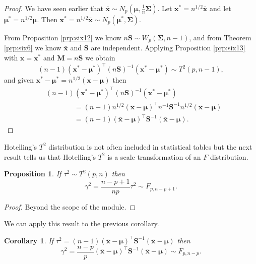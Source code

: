 \documentclass[]{book}
\newtheorem{corollary}{Corollary}[chapter]
\newtheorem{proposition}{Proposition}[chapter]
\theoremstyle{definition}
\theoremstyle{definition}
\theoremstyle{definition}
\theoremstyle{remark}
\begin{document}
\begin{proof}
{}We have seen earlier that \(\bar{\boldsymbol x} \sim N_p(\boldsymbol \mu,\frac{1}{n}\boldsymbol \Sigma)\). Let \(\boldsymbol x^\ast = n^{1/2} \bar{\boldsymbol x}\) and let \(\boldsymbol \mu^\ast = n^{1/2} \boldsymbol \mu\). Then \(\boldsymbol x^\ast=n^{1/2} \bar{\boldsymbol x} \sim N_p(\boldsymbol \mu^\ast, \boldsymbol \Sigma)\).

From Proposition \ref{prp:six12} we know \(n\boldsymbol S\sim W_p(\boldsymbol \Sigma,n-1)\), and from Theorem \ref{prp:six6} we know \(\bar{\boldsymbol x}\) and \(\boldsymbol S\) are independent. Applying Proposition \ref{prp:six13} with \(\boldsymbol x= \boldsymbol x^\ast\) and \(\boldsymbol M= n\boldsymbol S\) we obtain
\[ (n-1)(\boldsymbol x^\ast - \boldsymbol \mu^\ast)^\top (n\boldsymbol S)^{-1} (\boldsymbol x^\ast - \boldsymbol \mu^\ast) \sim T^2(p,n-1),\]
and given \(\boldsymbol x^\ast - \boldsymbol \mu^\ast = n^{1/2} (\boldsymbol x-\boldsymbol \mu)\) then
\begin{align*}
&(n-1)(\boldsymbol x^\ast - \boldsymbol \mu^\ast)^\top (n\boldsymbol S)^{-1} (\boldsymbol x^\ast - \boldsymbol \mu^\ast)\\
& \qquad \qquad = (n-1)n^{1/2}(\bar{\boldsymbol x}-\boldsymbol \mu)^\top n^{-1} \boldsymbol S^{-1} n^{1/2}(\bar{\boldsymbol x}-\boldsymbol \mu) \\
&\qquad \qquad = (n-1)(\bar{\boldsymbol x}-\boldsymbol \mu)^\top \boldsymbol S^{-1} (\bar{\boldsymbol x}-\boldsymbol \mu).
\end{align*}
\end{proof}

Hotelling's \(T^2\) distribution is not often included in statistical tables but the next result tells us that Hotelling's \(T^2\) is a scale transformation of an \(F\) distribution.

\begin{proposition}
\protect\hypertarget{prp:six14}{}{\label{prp:six14} }If \(\tau^2 \sim T^2(p,n)\) then
\[\gamma^2 = \frac{n-p+1}{np} \tau^2 \sim F_{p,n-p+1}.\]
\end{proposition}

\begin{proof}
{} Beyond the scope of the module.
\end{proof}

We can apply this result to the previous corollary.

\begin{corollary}
\protect\hypertarget{cor:csix6}{}{\label{cor:csix6} } If \(\tau^2 = (n-1)(\bar{\boldsymbol x}-\boldsymbol \mu)^\top \boldsymbol S^{-1} (\bar{\boldsymbol x}-\boldsymbol \mu)\) then
\[ \gamma^2 = \frac{n-p}{p} (\bar{\boldsymbol x}-\boldsymbol \mu)^\top \boldsymbol S^{-1} (\bar{\boldsymbol x}-\boldsymbol \mu) \sim F_{p,n-p}. \]
\end{corollary}
\end{document}
